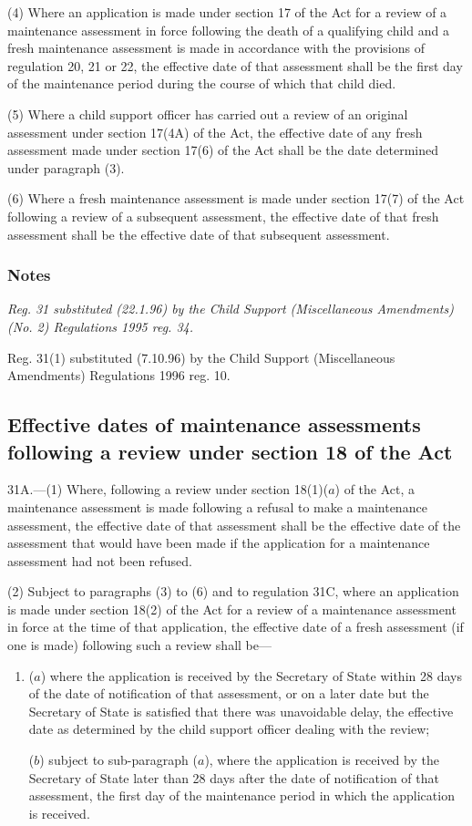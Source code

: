 \documentclass[a4paper]{article}
\newcommand\amendment[1]{\subsubsection*{Notes}{\itshape\frenchspacing\footnotesize #1 \par}}
\begin{document}
(4) Where an application is made under section 17 of the Act for a review of a maintenance assessment in force following the death of a qualifying child and a fresh maintenance assessment is made in accordance with the provisions of regulation 20, 21 or 22, the effective date of that assessment shall be the first day of the maintenance period during the course of which that child died.

(5) Where a child support officer has carried out a review of an original assessment under section 17(4A) of the Act, the effective date of any fresh assessment made under section 17(6) of the Act shall be the date determined under paragraph (3).

(6) Where a fresh maintenance assessment is made under section 17(7) of the Act following a review of a subsequent assessment, the effective date of that fresh assessment shall be the effective date of that subsequent assessment.

\amendment{
Reg. 31 substituted (22.1.96) by the Child Support (Miscellaneous Amendments) (No. 2) Regulations 1995 reg. 34.

Reg. 31(1) substituted (7.10.96) by the Child Support (Miscellaneous Amendments) Regulations 1996 reg. 10.
}

\subsection[31A. Effective dates of maintenance assessments following a review under section 18 of the Act]{Effective dates of maintenance assessments following a review under section 18 of the Act}

31A.—(1) Where, following a review under section 18(1)($a$) of the Act, a maintenance assessment is made following a refusal to make a maintenance assessment, the effective date of that assessment shall be the effective date of the assessment that would have been made if the application for a maintenance assessment had not been refused.

(2) Subject to paragraphs (3) to (6) and to regulation 31C, where an application is made under section 18(2) of the Act for a review of a maintenance assessment in force at the time of that application, the effective date of a fresh assessment (if one is made) following such a review shall be—
\begin{enumerate}\item[]
($a$) where the application is received by the Secretary of State within 28 days of the date of notification of that assessment, or on a later date but the Secretary of State is satisfied that there was unavoidable delay, the effective date as determined by the child support officer dealing with the review;

($b$) subject to sub-paragraph ($a$), where the application is received by the Secretary of State later than 28 days after the date of notification of that assessment, the first day of the maintenance period in which the application is received.
\end{enumerate}
\end{document}

